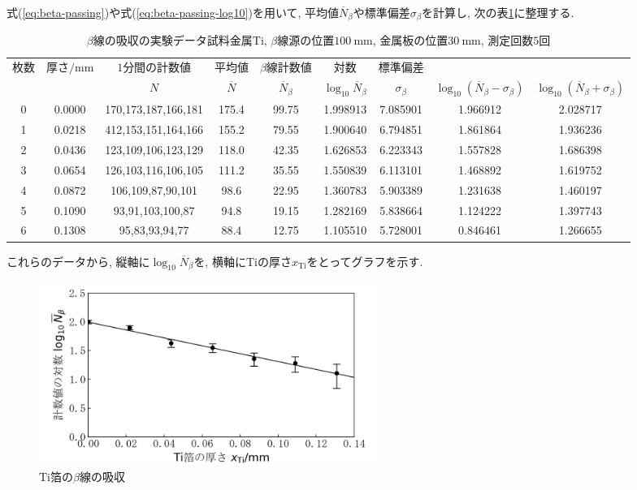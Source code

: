 \documentclass{jarticle}
\begin{document}
式(\ref{eq:beta-passing})や式(\ref{eq:beta-passing-log10})を用いて, 平均値$\overline{N}_\beta$や標準偏差$\sigma_\beta$を計算し, 次の表\ref{tb:absorption-Ti}に整理する.

\begin{table}[H]
  \caption{$\beta$線の吸収の実験データ\protect\linebreak 試料金属$\mathrm{Ti}$, $\beta$線源の位置$100\ \mathrm{mm}$, 金属板の位置$30\ \mathrm{mm}$, 測定回数$5$回}
  \label{tb:absorption-Ti}
  \small
  \hspace{-3.3cm}
  \begin{tabular}{ccccccccc}
    \hline
    枚数 & 厚さ$/\mathrm{mm}$ & $1$分間の計数値 & 平均値 & $\beta$線計数値 & 対数 & 標準偏差 & & \\
    & & $N$ & $\overline{N}$ & $\overline{N}_\beta$ & $\log_{10} \overline{N}_\beta$ & $\sigma_\beta$ & $\log_{10} (\overline{N}_\beta - \sigma_\beta)$ & $\log_{10} (\overline{N}_\beta + \sigma_\beta)$ \\
    \hline
    0 & 0.0000 & 170,173,187,166,181 & 175.4 & 99.75 & 1.998913 & 7.085901 & 1.966912 & 2.028717 \\
    1 & 0.0218 & 412,153,151,164,166 & 155.2 & 79.55 & 1.900640 & 6.794851 & 1.861864 & 1.936236 \\
    2 & 0.0436 & 123,109,106,123,129 & 118.0 & 42.35 & 1.626853 & 6.223343 & 1.557828 & 1.686398 \\
    3 & 0.0654 & 126,103,116,106,105 & 111.2 & 35.55 & 1.550839 & 6.113101 & 1.468892 & 1.619752 \\
    4 & 0.0872 & 106,109,87,90,101 & 98.6 & 22.95 & 1.360783 & 5.903389 & 1.231638 & 1.460197 \\
    5 & 0.1090 & 93,91,103,100,87 & 94.8 & 19.15 & 1.282169 & 5.838664 & 1.124222 & 1.397743 \\
    6 & 0.1308 & 95,83,93,94,77 & 88.4 & 12.75 & 1.105510 & 5.728001 & 0.846461 & 1.266655 \\
    \hline
  \end{tabular}
\end{table}

これらのデータから, 縦軸に$\log_{10}\overline{N}_\beta$を, 横軸に$\mathrm{Ti}$の厚さ$x_\mathrm{Ti}$をとってグラフを示す.

\begin{figure}[H]
  \begin{center}
    \includegraphics[width=110mm]{graph/absorption-Ti.png}
    \caption{$\mathrm{Ti}$箔の$\beta$線の吸収}
    \label{fg:absorption-Ti}
  \end{center}
\end{figure}
\end{document}
